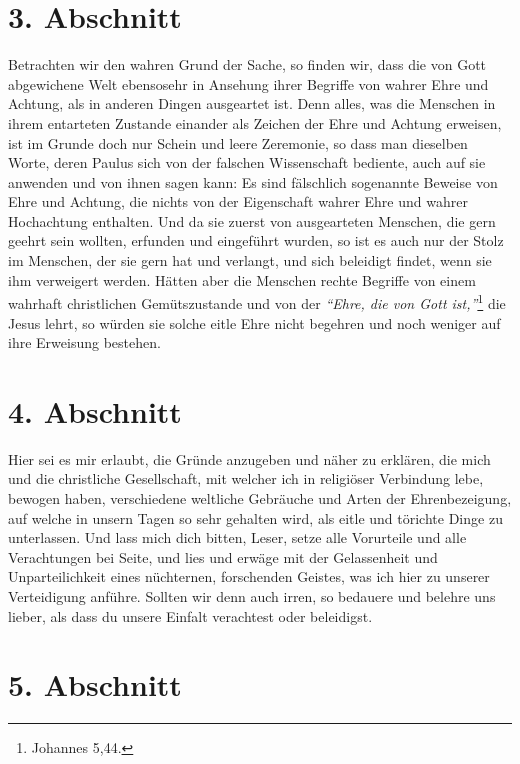 \section{3. Abschnitt} \label{kap9_ab3}

Betrachten wir den wahren Grund der Sache, so finden wir, dass die von Gott
abgewichene Welt ebensosehr in Ansehung ihrer Begriffe von wahrer Ehre und
Achtung, als in anderen Dingen ausgeartet ist. Denn alles, was die Menschen in
ihrem entarteten Zustande einander als Zeichen der Ehre und Achtung erweisen,
ist im Grunde doch nur Schein und leere Zeremonie, so dass man dieselben Worte,
deren Paulus sich von der falschen
Wissenschaft bediente, auch auf sie
anwenden und von ihnen sagen kann: Es sind fälschlich sogenannte Beweise von
Ehre und Achtung, die nichts von der Eigenschaft wahrer Ehre und wahrer
Hochachtung enthalten. Und da sie zuerst von ausgearteten Menschen, die gern
geehrt sein wollten, erfunden und eingeführt wurden, so ist es auch nur der
Stolz im Menschen, der sie gern hat und verlangt, und sich beleidigt findet,
wenn sie ihm verweigert werden. Hätten aber die Menschen rechte Begriffe von
einem wahrhaft christlichen Gemütszustande und von der
\textit{"`Ehre, die von Gott ist,"'}\footnote{Johannes 5,44.}
die Jesus lehrt, so würden sie solche eitle
Ehre nicht begehren und noch weniger auf ihre Erweisung bestehen.

\section{4. Abschnitt} \label{kap9_ab4}

Hier sei es mir erlaubt, die Gründe anzugeben und näher zu erklären, die mich
und die christliche Gesellschaft, mit welcher ich in religiöser Verbindung lebe,
bewogen haben, verschiedene weltliche Gebräuche und Arten der Ehrenbezeigung,
auf welche in unsern Tagen so sehr gehalten wird, als eitle und törichte Dinge
zu unterlassen. Und lass mich dich bitten, Leser, setze alle Vorurteile und alle
Verachtungen bei Seite, und lies und erwäge mit der Gelassenheit und
Unparteilichkeit eines nüchternen, forschenden Geistes, was ich hier zu unserer
Verteidigung anführe. Sollten wir denn auch irren, so bedauere und belehre uns
lieber, als dass du unsere Einfalt verachtest oder beleidigst.

\section{5. Abschnitt} \label{kap9_ab5}

